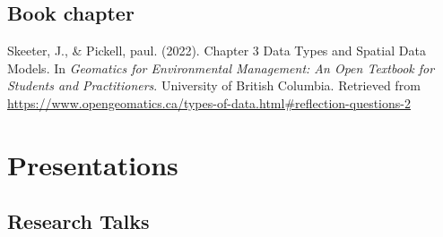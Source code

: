 \documentclass[
]{article}
\newlength{\cslhangindent}
\newlength{\cslentryspacingunit} %
\newenvironment{CSLReferences}[2] %
 {%
  \setlength{\parindent}{0pt}
  \ifodd #1
  \let\oldpar\par
  \def\par{\hangindent=\cslhangindent\oldpar}
  \fi
  \setlength{\parskip}{#2\cslentryspacingunit}
 }%
 {}
\begin{document}
\hypertarget{book-chapter}{%
\subsection{Book chapter}\label{book-chapter}}

\hypertarget{refs-3.2}{}
\begin{CSLReferences}{1}{0}
\leavevmode{}%
Skeeter, J., \& Pickell, paul. (2022). Chapter 3 {Data} {Types} and
{Spatial} {Data} {Models}. In \emph{Geomatics for {Environmental}
{Management}: {An} {Open} {Textbook} for {Students} and
{Practitioners}}. University of British Columbia. Retrieved from
\url{https://www.opengeomatics.ca/types-of-data.html\#reflection-questions-2}

\end{CSLReferences}

\hypertarget{presentations}{%
\section{Presentations}\label{presentations}}

\hypertarget{research-talks}{%
\subsection{Research Talks}\label{research-talks}}
\end{document}
